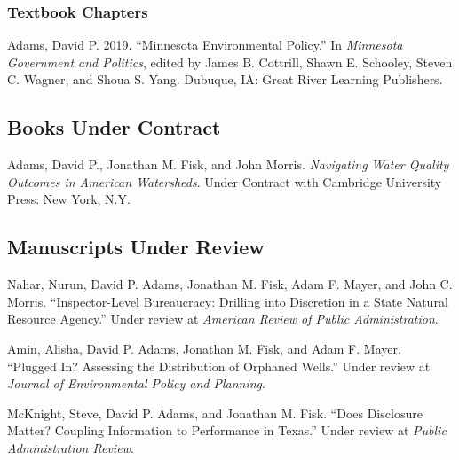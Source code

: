 \documentclass[12pt,letterpaper]{article}
\renewenvironment{itemize}{
  \begin{list}{}{
    \setlength{\leftmargin}{1.5em}
    \setlength{\itemsep}{0.25em}
    \setlength{\parskip}{0pt}
    \setlength{\parsep}{0.25em}
  }
}{
  \end{list}
}
\begin{document}
\subsubsection*{Textbook Chapters}
\begin{itemize}\leftmargin=2pt\itemindent=-15pt
  \item Adams, David P. 2019. ``Minnesota Environmental Policy.'' In \emph{Minnesota Government and Politics}, edited by James B. Cottrill, Shawn E. Schooley, Steven C. Wagner, and Shoua S. Yang. Dubuque, IA: Great River Learning Publishers.
\end{itemize}

\subsection*{Books Under Contract}

\begin{itemize}\leftmargin=2pt\itemindent=-15pt\leftmargin=2pt\itemindent=-15pt
  \item Adams, David P., Jonathan M. Fisk, and John Morris. \emph{Navigating Water Quality Outcomes in American Watersheds}. Under Contract with Cambridge University Press: New York, N.Y.
\end{itemize}

\subsection*{Manuscripts Under Review}
\begin{itemize}\leftmargin=2pt\itemindent=-15pt\leftmargin=2pt\itemindent=-15pt
  
  \item Nahar, Nurun, David P. Adams, Jonathan M. Fisk, Adam F. Mayer, and John C. Morris. ``Inspector-Level Bureaucracy: Drilling into Discretion in a State Natural Resource Agency.'' Under review at \emph{American Review of Public Administration}.
  
  \item Amin, Alisha, David P. Adams, Jonathan M. Fisk, and Adam F. Mayer. ``Plugged In? Assessing the Distribution of Orphaned Wells.'' Under review at \emph{Journal of Environmental Policy and Planning}.
  
  \item McKnight, Steve, David P. Adams, and Jonathan M. Fisk. ``Does Disclosure Matter? Coupling Information to Performance in Texas.'' Under review at \emph{Public Administration Review}.

\end{itemize}
\end{document}
